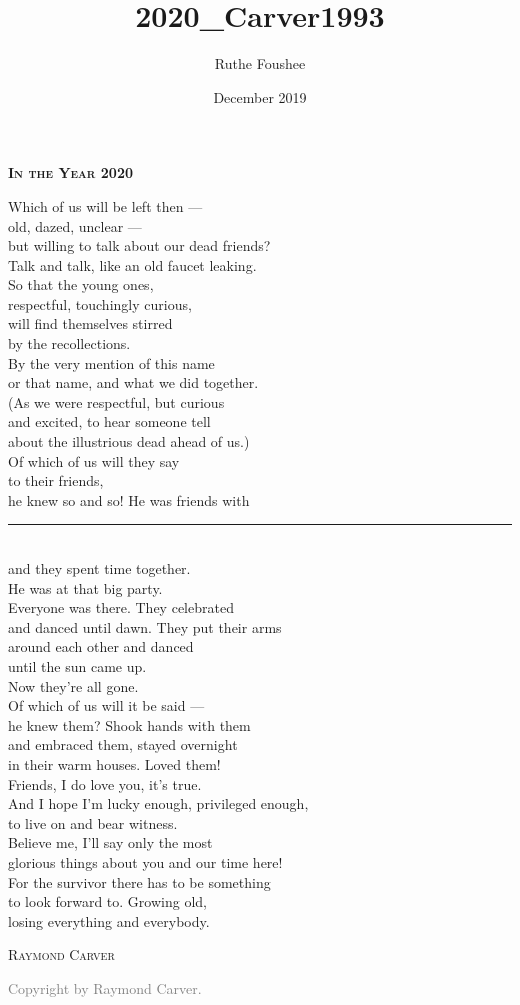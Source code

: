 \documentclass[11pt]{memoir}
\title{2020_Carver1993}
\author{Ruthe Foushee}
\date{December 2019}
\begin{document}
\thispagestyle{empty}
\noindent \textbf{\textsc{\Large In the Year 2020}}
\vspace{18pt}

Which of us will be left then ---\\
old, dazed, unclear ---\\
but willing to talk about our dead friends?\\
Talk and talk, like an old faucet leaking.\\
So that the young ones,\\
respectful, touchingly curious,\\
will find themselves stirred\\
by the recollections.\\
By the very mention of this name\\
or that name, and what we did together.\\
(As we were respectful, but curious\\
and excited, to hear someone tell\\
about the illustrious dead ahead of us.)\\
Of which of us will they say\\ 
to their friends,\\
he knew so and so! He was friends with \rule{1cm}{0.20mm}\\
and they spent time together.\\
He was at that big party.\\
Everyone was there. They celebrated\\
and danced until dawn. They put their arms\\
around each other and danced\\
until the sun came up.\\
Now they're all gone.\\
Of which of us will it be said ---\\
he knew them? Shook hands with them\\
and embraced them, stayed overnight\\
in their warm houses. Loved them!\\

Friends, I do love you, it's true.\\
And I hope I'm lucky enough, privileged enough,\\
to live on and bear witness.\\
Believe me, I'll say only the most\\
glorious things about you and our time here!\\
For the survivor there has to be something\\
to look forward to. Growing old,\\
losing everything and everybody.

\vspace{22pt}
\hspace{62pt} \textsc{Raymond Carver}\\
\vfill
\noindent\footnotesize{

\textcolor{gray}{Copyright  by Raymond Carver.}} 
\end{document}
